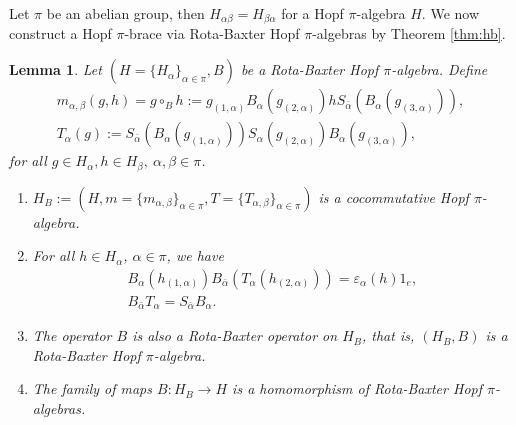 \documentclass[11pt]{article}
\def\a{\alpha}
\def\b{\beta}
\def\v{\varepsilon}
\newtheorem{lemma}[theorem]{Lemma}
\begin{document}
Let $\pi$ be an abelian group, then $H_{\a\b}=H_{\b\a}$ for a Hopf $\pi$-algebra $H$.
We now construct a Hopf $\pi$-brace via Rota-Baxter Hopf $\pi$-algebras by Theorem \ref{thm:hb}.

\begin{lemma}\label{lem:nH}
Let $(H=\{H_\a\}_{\a\in\pi},B)$ be a Rota-Baxter Hopf $\pi$-algebra. Define
\begin{eqnarray}
& m_{\a,\b}(g,h)=g\circ_B h:=g_{(1,\a)}B_\a(g_{(2,\a)})hS_{\bar{\a}}(B_\a(g_{(3,\a)})), & \label{eq:RBHm}\\
& T_\a(g):=S_{\bar{\a}}(B_\a(g_{(1,\a)}))S_\a(g_{(2,\a)})B_\a(g_{(3,\a)}), & \label{eq:RBHS}
\end{eqnarray}
for all $g\in H_\a,h\in H_\b, ~\a,\b\in\pi$.
\begin{enumerate}[\quad\rm(1)]
\item $H_B:=(H,m=\{m_{\a,\b}\}_{\a\in\pi},T=\{T_{\a,\b}\}_{\a\in\pi})$ is a cocommutative Hopf $\pi$-algebra. %
\item For all $h\in H_\a$, $\a\in\pi$, we have
\begin{eqnarray}
 & B_\a(h_{(1,\a)})B_{\bar{\a}}(T_\a(h_{(2,\a)}))=\v_\a(h)1_e, \label{eq:t} & \\
 & B_{\bar{\a}}T_\a = S_{\bar{\a}}B_\a. &
\end{eqnarray}

\item The operator $B$ is also a Rota-Baxter operator on $H_B$, that is, $(H_B,B)$ is a Rota-Baxter Hopf $\pi$-algebra.
\item The family of maps $B:H_B\rightarrow H$ is a homomorphism of Rota-Baxter Hopf $\pi$-algebras.
\end{enumerate}
\end{lemma}
\end{document}
